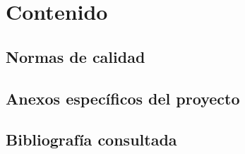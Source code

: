\section{Contenido}

\subsection{Normas de calidad}
\subsection{Anexos específicos del proyecto}
\subsection{Bibliografía consultada}
